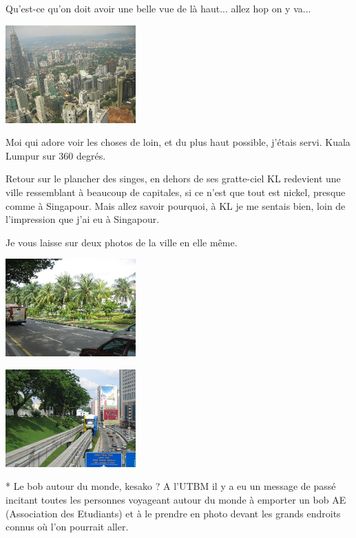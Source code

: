 \begin{multicols}{2}
Qu'est-ce qu'on doit avoir une belle vue de là haut... allez hop on y va...

\smallbreak
\hspace*{-0.65cm}
\includegraphics[width=5cm]{articles/Kuala-lumpur/1211014913RrBL.jpg}
\smallbreak

Moi qui adore voir les choses de loin, et du plus haut possible, j'étais servi. Kuala Lumpur sur 360 degrés.

Retour sur le plancher des singes, en dehors de ses gratte-ciel KL redevient une ville ressemblant à beaucoup de capitales, si ce n'est que tout est nickel, presque comme à Singapour. Mais allez savoir pourquoi, à KL je me sentais bien, loin de l'impression que j'ai eu à Singapour.

Je vous laisse sur deux photos de la ville en elle même.

\smallbreak
\hspace*{-0.65cm}
\includegraphics[width=5cm]{articles/Kuala-lumpur/1211016874hbIL.jpg}
\smallbreak

\smallbreak
\hspace*{-0.65cm}
\includegraphics[width=5cm]{articles/Kuala-lumpur/1211017229ryCi.jpg}
\smallbreak

\end{multicols}

 * Le bob autour du monde, kesako ? A l'UTBM il y a eu un message de passé incitant toutes les personnes voyageant autour du monde à emporter un bob AE (Association des Etudiants) et à le prendre en photo devant les grands endroits connus où l'on pourrait aller.



